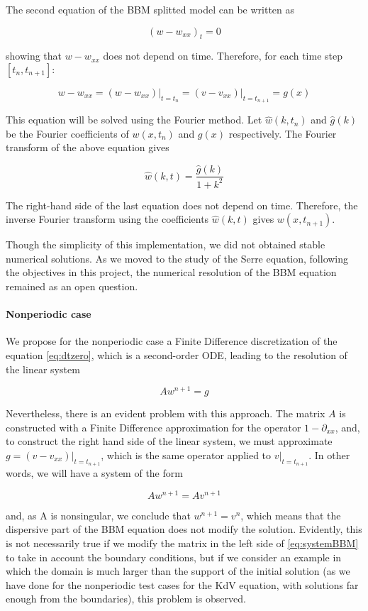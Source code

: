 \indent The second equation of the BBM splitted model can be written as

$$(w - w_{xx})_t=0$$

\noindent showing that $w - w_{xx}$ does not depend on time. Therefore, for each time step $[t_n,t_{n+1}] : $

$$ \label{eq:dtzero}w - w_{xx} = (w - w_{xx})\rvert_{t=t_n} = (v - v_{xx})\rvert_{t=t_{n+1}} = g(x)$$

\indent This equation will be solved using the Fourier method. Let $\hat{w}(k,t_n)$ and $\hat{g}(k)$ be the Fourier coefficients of $w(x,t_n)$ and $g(x)$ respectively.  The Fourier transform of the above equation gives

$$\hat{w}(k,t) = \frac{\hat{g}(k)}{1+k^2}$$

\indent The right-hand side of the last equation does not depend on time. Therefore, the inverse Fourier transform using the coefficients $\hat{w}(k,t)$ gives $w(x,t_{n+1})$.

\indent Though the simplicity of this implementation, we did not obtained stable numerical solutions. As we moved to the study of the Serre equation, following the objectives in this project, the numerical resolution of the BBM equation remained as an open question.

\paragraph{Nonperiodic case}

\indent We propose for the nonperiodic case a Finite Difference discretization of the equation \eqref{eq:dtzero}, which is a second-order ODE, leading to the resolution of the linear system

$$Aw^{n+1} = g$$

\indent Nevertheless, there is an evident problem with this approach. The matrix $A$ is constructed with a Finite Difference approximation for the operator $1 - \partial_{xx}$, and, to construct the right hand side of the linear system, we must approximate  $ g = (v - v_{xx})\rvert_{t=t_{n+1}} $, which is the same operator applied to $v\rvert_{t=t_{n+1}}$. In other words, we will have a system of the form

$$ \label{eq:systemBBM} Aw^{n+1} = Av^{n+1}$$

\noindent and, as A is nonsingular, we conclude that $w^{n+1} = v^{n}$, which means that the dispersive part of the BBM equation does not modify the solution. Evidently, this is not necessarily true if we modify the matrix in the left side of \ref{eq:systemBBM} to take in account the boundary conditions, but if we consider an example in which the domain is much larger than the support of the initial solution (as we have done for the nonperiodic test cases for the KdV equation, with solutions far enough from the boundaries), this problem is observed.
